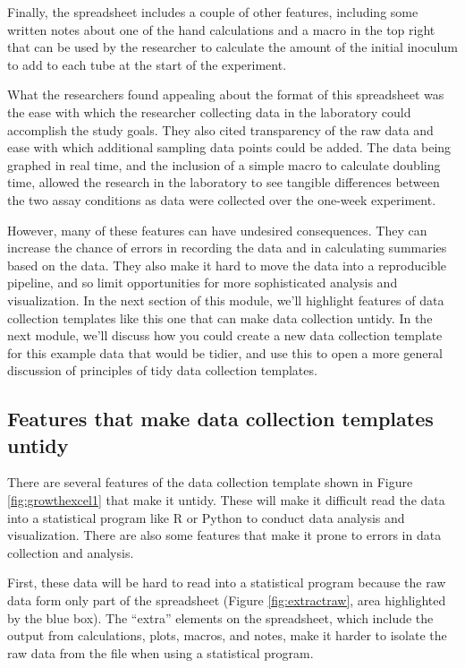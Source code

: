 \documentclass[]{tufte-book}
\begin{document}
Finally, the spreadsheet includes a couple of other features, including some
written notes about one of the hand calculations and a macro in the top right
that can be used by the researcher to calculate the amount of the initial
inoculum to add to each tube at the start of the experiment.

What the researchers found appealing about the format of this spreadsheet was
the ease with which the researcher collecting data in the laboratory could
accomplish the study goals. They also cited transparency of the raw data and
ease with which additional sampling data points could be added. The data being
graphed in real time, and the inclusion of a simple macro to calculate doubling
time, allowed the research in the laboratory to see tangible differences between
the two assay conditions as data were collected over the one-week experiment.

However, many of these features can have undesired consequences. They can increase
the chance of errors in recording the data and in calculating summaries based on the
data. They also make it hard to move the data into a reproducible pipeline, and
so limit opportunities for more sophisticated analysis and visualization. In the
next section of this module, we'll highlight features of data collection templates
like this one that can make data collection untidy. In the next module,
we'll discuss how you could create a new data collection template for this example
data that would be tidier, and use this to open a more general discussion of
principles of tidy data collection templates.

\subsection{Features that make data collection templates untidy}\label{features-that-make-data-collection-templates-untidy}

There are several features of the data collection template shown in Figure
\ref{fig:growthexcel1} that make it untidy. These will make it difficult read
the data into a statistical program like R or Python to conduct data analysis
and visualization. There are also some features that make it prone to errors in
data collection and analysis.

First, these data will be hard to read into a statistical program because the
raw data form only part of the spreadsheet (Figure \ref{fig:extractraw}, area
highlighted by the blue box). The ``extra'' elements on the spreadsheet, which
include the output from calculations, plots, macros, and notes, make it harder
to isolate the raw data from the file when using a statistical program.
\end{document}
